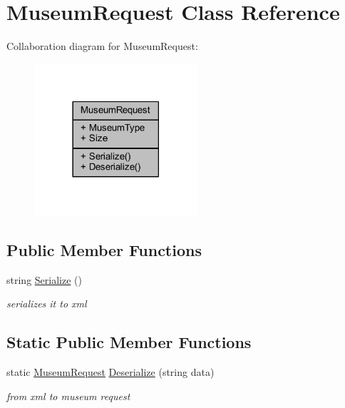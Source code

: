 \hypertarget{class_museum_request}{}\section{Museum\+Request Class Reference}
\label{class_museum_request}


Collaboration diagram for Museum\+Request\+:
\nopagebreak
\begin{figure}[H]
\begin{center}
\leavevmode
\includegraphics[width=170pt]{class_museum_request__coll__graph}
\end{center}
\end{figure}
\subsection*{Public Member Functions}
\begin{DoxyCompactItemize}
\item 
string \mbox{\hyperlink{class_museum_request_ae227bce4871f20bf6661db4a5af5fe1c}{Serialize}} ()
\begin{DoxyCompactList}\small\item\em serializes it to xml \end{DoxyCompactList}\end{DoxyCompactItemize}
\subsection*{Static Public Member Functions}
\begin{DoxyCompactItemize}
\item 
static \mbox{\hyperlink{class_museum_request}{Museum\+Request}} \mbox{\hyperlink{class_museum_request_abd551a45744c8387841c20e5ef46d420}{Deserialize}} (string data)
\begin{DoxyCompactList}\small\item\em from xml to museum request \end{DoxyCompactList}\end{DoxyCompactItemize}
